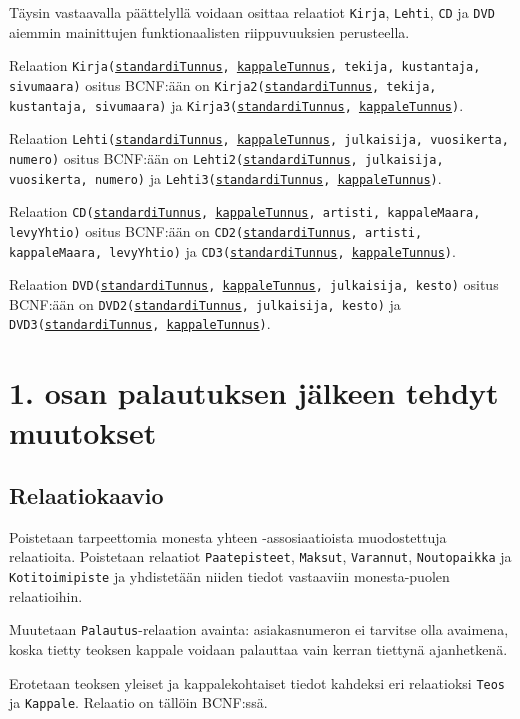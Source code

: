 \documentclass[12pt,titlepage] {article}
\begin{document}
Täysin vastaavalla päättelyllä voidaan osittaa relaatiot \texttt{Kirja}, \texttt{Lehti}, \texttt{CD} ja \texttt{DVD} aiemmin mainittujen funktionaalisten riippuvuuksien perusteella.

Relaation \texttt{Kirja(\underline{standardiTunnus}, \underline{kappaleTunnus}, tekija, kustantaja, sivumaara)} ositus BCNF:ään on \texttt{Kirja2(\underline{standardiTunnus}, tekija, kustantaja, sivumaara)} ja \texttt{Kirja3(\underline{standardiTunnus}, \underline{kappaleTunnus})}.

Relaation \texttt{Lehti(\underline{standardiTunnus}, \underline{kappaleTunnus}, julkaisija, vuosikerta, numero)} ositus BCNF:ään on \texttt{Lehti2(\underline{standardiTunnus}, julkaisija, vuosikerta, numero)} ja \texttt{Lehti3(\underline{standardiTunnus}, \underline{kappaleTunnus})}.

Relaation \texttt{CD(\underline{standardiTunnus}, \underline{kappaleTunnus}, artisti, kappaleMaara, levyYhtio)} ositus BCNF:ään on \texttt{CD2(\underline{standardiTunnus}, artisti, kappaleMaara, levyYhtio)} ja \texttt{CD3(\underline{standardiTunnus}, \underline{kappaleTunnus})}.

Relaation \texttt{DVD(\underline{standardiTunnus}, \underline{kappaleTunnus}, julkaisija, kesto)} ositus BCNF:ään on \texttt{DVD2(\underline{standardiTunnus}, julkaisija, kesto)} ja \texttt{DVD3(\underline{standardiTunnus}, \underline{kappaleTunnus})}.

\section {1. osan palautuksen jälkeen tehdyt muutokset}

\subsection {Relaatiokaavio}

Poistetaan tarpeettomia monesta yhteen -assosiaatioista muodostettuja relaatioita. Poistetaan relaatiot \texttt{Paatepisteet}, \texttt{Maksut}, \texttt{Varannut}, \texttt{Noutopaikka} ja \texttt{Kotitoimipiste} ja yhdistetään niiden tiedot vastaaviin monesta-puolen relaatioihin.

Muutetaan \texttt{Palautus}-relaation avainta: asiakasnumeron ei tarvitse olla avaimena, koska tietty teoksen kappale voidaan palauttaa vain kerran tiettynä ajanhetkenä.

Erotetaan teoksen yleiset ja kappalekohtaiset tiedot kahdeksi eri relaatioksi \texttt{Teos} ja \texttt{Kappale}. Relaatio on tällöin BCNF:ssä.
\end{document}
